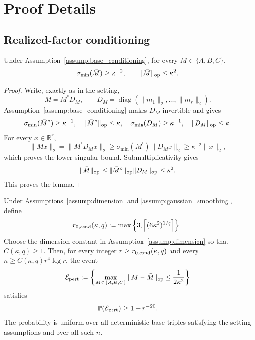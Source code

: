 \appendix

\section{Proof Details}\label{sec:proof-details}

\subsection{Realized-factor conditioning}\label{app:step-001}

\begin{lemma}
\label{lem:step-001-base-conditioning}
Under Assumption~\ref{assump:base_conditioning}, for every
\(\bar M\in\{\bar A,\bar B,\bar C\}\),
\[
  \sigma_{\min}(\bar M)\ge \kappa^{-2},
  \qquad
  \|\bar M\|_{\rm op}\le \kappa^2.
\]

\end{lemma}

\begin{proof}
Write, exactly as in the setting,
\[
  \bar M=\bar M^\circ D_M,
  \qquad
  D_M=\operatorname{diag}(\|\bar m_1\|_2,\ldots,
  \|\bar m_r\|_2).
\]
Assumption~\ref{assump:base_conditioning} makes \(D_M\) invertible and gives
\[
  \sigma_{\min}(\bar M^\circ)\ge\kappa^{-1},\quad
  \|\bar M^\circ\|_{\rm op}\le\kappa,\quad
  \sigma_{\min}(D_M)\ge\kappa^{-1},\quad
  \|D_M\|_{\rm op}\le\kappa.
\]
For every \(x\in\mathbb R^r\),
\[
  \|\bar Mx\|_2
  =\|\bar M^\circ D_Mx\|_2
  \ge \sigma_{\min}(\bar M^\circ)\|D_Mx\|_2
  \ge \kappa^{-2}\|x\|_2,
\]
which proves the lower singular bound. Submultiplicativity gives
\[
  \|\bar M\|_{\rm op}
  \le \|\bar M^\circ\|_{\rm op}\|D_M\|_{\rm op}
  \le \kappa^2.
\]
This proves the lemma. 

\end{proof}


\begin{lemma}
\label{lem:step-001-gaussian-perturbation}
Under Assumptions~\ref{assump:dimension} and
\ref{assump:gaussian_smoothing}, define
\[
  r_{0,\rm cond}(\kappa,q)
  :=\max\left\{3,\left\lceil(6\kappa^2)^{1/q}\right\rceil\right\}.
\]
Choose the dimension constant in Assumption~\ref{assump:dimension} so that
\(C(\kappa,q)\ge1\). Then, for every integer
\(r\ge r_{0,\rm cond}(\kappa,q)\) and every
\(n\ge C(\kappa,q)r^4\log r\), the event
\[
  \mathcal E_{\rm pert}
  :=\left\{
    \max_{M\in\{A,B,C\}}\|M-\bar M\|_{\rm op}
    \le \frac1{2\kappa^2}
  \right\}
\]
satisfies
\[
  \mathbb P(\mathcal E_{\rm pert})\ge1-r^{-20}.
\]
The probability is uniform over all deterministic base triples satisfying the
setting assumptions and over all such \(n\).

\end{lemma}

